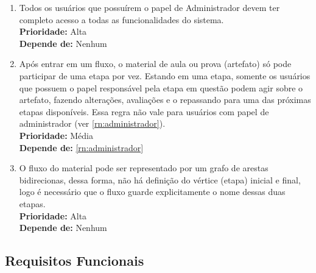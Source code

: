 \begin{enumerate}[label=\textbf{RN\protect\twodigits{\theenumi}}, leftmargin=2cm]
	\item \label{rn:administrador} Todos os usuários que possuírem o papel de Administrador devem ter completo acesso a todas as funcionalidades do sistema. \\
		\textbf{Prioridade:} Alta \\
		\textbf{Depende de:} Nenhum

	\item \label{rn:artefato_na_etapa} Após entrar em um fluxo, o material de aula ou prova (artefato) só pode participar de uma etapa por vez. Estando em uma etapa, somente os usuários que possuem o papel responsável pela etapa em questão podem agir sobre o artefato, fazendo alterações, avaliações e o repassando para uma das próximas etapas disponíveis. Essa regra não vale para usuários com papel de administrador (ver \hyperref[rn:administrador]{\ref{rn:administrador}}). \\
		\textbf{Prioridade:} Média \\
		\textbf{Depende de:} \hyperref[rn:administrador]{\ref{rn:administrador}}

	\item \label{rn:etapa_inicial_e_final_do_fluxo} O fluxo do material pode ser representado por um grafo de arestas bidirecionas, dessa forma, não há definição do vértice (etapa) inicial e final, logo é necessário que o fluxo guarde explicitamente o nome dessas duas etapas. \\
		\textbf{Prioridade:} Alta \\
		\textbf{Depende de:} Nenhum

\end{enumerate}

\subsection{Requisitos Funcionais}
		
